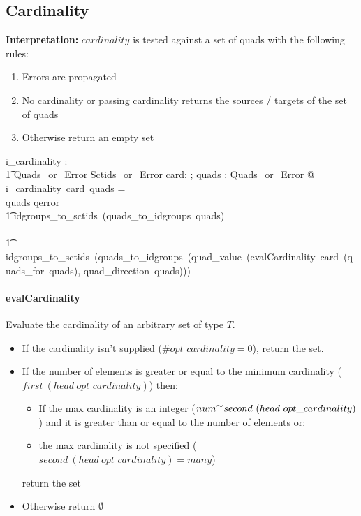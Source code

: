 \documentclass{article}
\begin{document}
\subsection{Cardinality}
\textbf{Interpretation:}
$cardinality$ is tested against a set of quads with the following rules:
\begin{enumerate}
\item Errors are propagated
\item No cardinality or passing cardinality returns  the sources / targets of the set of quads
\item Otherwise return an empty set
\end{enumerate}
\begin{gendef}
   i\_cardinality :  \\
\t1 \optional[cardinality] \fun Quads\_or\_Error \fun  Sctids\_or\_Error
\where
   \forall card: \optional[cardinality]; quads : Quads\_or\_Error  @ \\
i\_cardinality~card~quads = \\
\IF quads \in \ran qerror \\
\t1 \THEN idgroups\_to\_sctids~(quads\_to\_idgroups~quads) \\
\ELSE  \\
\t1 idgroups\_to\_sctids~(quads\_to\_idgroups~(quad\_value~(evalCardinality~card~(quads\_for~quads), quad\_direction~quads))) 
\end{gendef}

\paragraph{evalCardinality}
Evaluate the cardinality of an arbitrary set of type $T$.  
\begin{itemize}[noitemsep,nolistsep]
\item If the cardinality isn't supplied ($\#opt\_cardinality = 0$), return the set.
\item If the number of elements is greater or equal to the minimum cardinality ($first~(head~opt\_cardinality)$) then:
\begin{itemize}[noitemsep,nolistsep]
\item If the max cardinality is an integer ($num \inv second~(head~opt\_cardinality)$) and it is greater than or equal to the number of elements or:
\item the max cardinality is not specified ($second~(head~opt\_cardinality) = many$)
\end{itemize}
return the set
\item Otherwise return $\emptyset$
\end{itemize}
\end{document}
